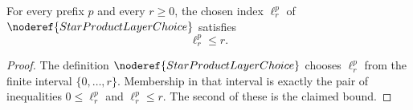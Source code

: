 \begin{lemma}
For every prefix \(p\) and every \(r\ge0\), the chosen index
\(\ell_r^p\) of \(\noderef{StarProductLayerChoice}\) satisfies
\[
  \ell_r^p\le r.
\]
\end{lemma}
\begin{proof}
The definition \(\noderef{StarProductLayerChoice}\) chooses
\(\ell_r^p\) from the finite interval \(\{0,\ldots,r\}\).  Membership in
that interval is exactly the pair of inequalities \(0\le \ell_r^p\) and
\(\ell_r^p\le r\).  The second of these is the claimed bound.
\end{proof}
